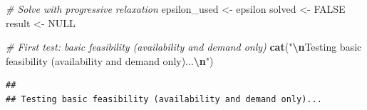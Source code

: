 \documentclass[
]{article}
\newenvironment{Shaded}{\begin{snugshade}}{\end{snugshade}}
\newcommand{\CommentTok}[1]{\textcolor[rgb]{0.56,0.35,0.01}{\textit{#1}}}
\newcommand{\ConstantTok}[1]{\textcolor[rgb]{0.56,0.35,0.01}{#1}}
\newcommand{\FunctionTok}[1]{\textcolor[rgb]{0.13,0.29,0.53}{\textbf{#1}}}
\newcommand{\NormalTok}[1]{#1}
\newcommand{\OtherTok}[1]{\textcolor[rgb]{0.56,0.35,0.01}{#1}}
\newcommand{\SpecialCharTok}[1]{\textcolor[rgb]{0.81,0.36,0.00}{\textbf{#1}}}
\newcommand{\StringTok}[1]{\textcolor[rgb]{0.31,0.60,0.02}{#1}}
\begin{document}
\begin{Shaded}
\begin{Highlighting}[]
\CommentTok{\# Solve with progressive relaxation}
\NormalTok{epsilon\_used }\OtherTok{\textless{}{-}}\NormalTok{ epsilon}
\NormalTok{solved }\OtherTok{\textless{}{-}} \ConstantTok{FALSE}
\NormalTok{result }\OtherTok{\textless{}{-}} \ConstantTok{NULL}

\CommentTok{\# First test: basic feasibility (availability and demand only)}
\FunctionTok{cat}\NormalTok{(}\StringTok{"}\SpecialCharTok{\textbackslash{}n}\StringTok{Testing basic feasibility (availability and demand only)...}\SpecialCharTok{\textbackslash{}n}\StringTok{"}\NormalTok{)}
\end{Highlighting}
\end{Shaded}

\begin{verbatim}
## 
## Testing basic feasibility (availability and demand only)...
\end{verbatim}
\end{document}
